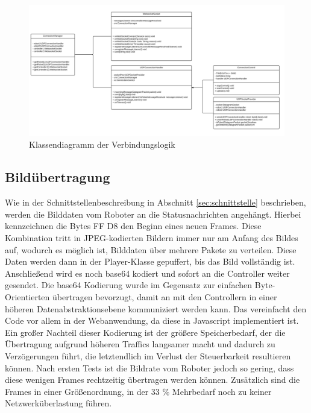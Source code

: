 \begin{figure}[h]
	\includegraphics[width=\textwidth]{images/uml_verbindung.pdf}
	\caption{Klassendiagramm der Verbindungslogik}
	\label{fig:uml_verbindung}
\end{figure}



\subsection{Bildübertragung}
Wie in der Schnittstellenbeschreibung in Abschnitt \ref{sec:schnittstelle} beschrieben, werden die Bilddaten vom Roboter an die Statusnachrichten angehängt. Hierbei kennzeichnen die Bytes FF D8 den Beginn eines neuen Frames. Diese Kombination tritt in JPEG-kodierten Bildern immer nur am Anfang des Bildes auf, wodurch es möglich ist, Bilddaten über mehrere Pakete zu verteilen. Diese Daten werden dann in der Player-Klasse gepuffert, bis das Bild vollständig ist. Anschließend wird es noch base64 kodiert und sofort an die Controller weiter gesendet. Die base64 Kodierung wurde im Gegensatz zur einfachen Byte-Orientierten übertragen bevorzugt, damit an mit den Controllern in einer höheren Datenabstraktionsebene kommuniziert werden kann. Das vereinfacht den Code vor allem in der Webanwendung, da diese in Javascript implementiert ist. Ein großer Nachteil dieser Kodierung ist der größere Speicherbedarf, der die Übertragung aufgrund höheren Traffics langsamer macht und dadurch zu Verzögerungen führt, die letztendlich im Verlust der Steuerbarkeit resultieren können. Nach ersten Tests ist die Bildrate vom Roboter jedoch so gering, dass diese wenigen Frames rechtzeitig übertragen werden können. Zusätzlich sind die Frames in einer Größenordnung, in der 33 \% Mehrbedarf noch zu keiner Netzwerküberlastung führen.



